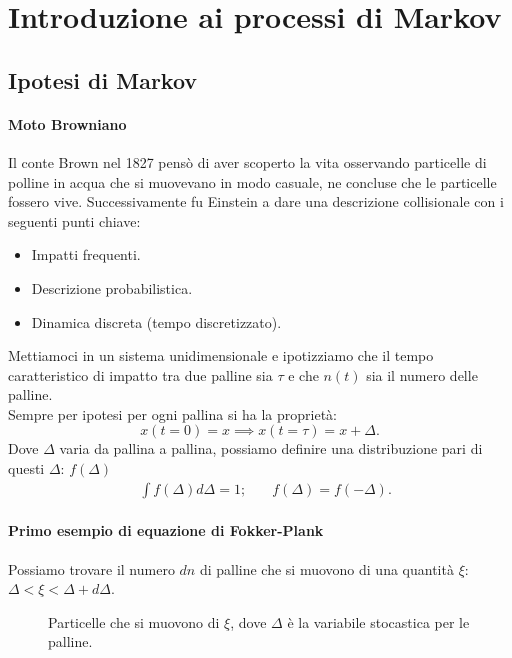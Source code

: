 \section{Introduzione ai processi di Markov}%
\label{sub:Lezione 1}
\mylocaltoc
\subsection{Ipotesi di Markov}%
\paragraph{Moto Browniano}
Il conte Brown nel 1827 pensò di aver scoperto la vita osservando particelle di polline in acqua che si muovevano in modo casuale, ne concluse che le particelle fossero vive. Successivamente fu Einstein a dare una descrizione collisionale con i seguenti punti chiave:
\begin{itemize}
    \item Impatti frequenti.
    \item Descrizione probabilistica.
    \item Dinamica discreta (tempo discretizzato).
\end{itemize}
Mettiamoci in un sistema unidimensionale e ipotizziamo che il tempo caratteristico di impatto tra due palline sia $\tau$ e che $n(t)$ sia il numero delle palline.\\
Sempre per ipotesi per ogni pallina si ha la proprietà:
\[
    x(t=0) = x \implies  x(t=\tau) = x + \Delta
.\] 
Dove $\Delta$ varia da pallina a pallina, possiamo definire una distribuzione pari di questi $\Delta$: $f(\Delta)$
\[\begin{aligned}
    &\int f(\Delta) d\Delta = 1; \quad &f(\Delta) = f(-\Delta) 
.\end{aligned}\]
\paragraph{Primo esempio di equazione di Fokker-Plank}%
Possiamo trovare il numero $dn$ di palline che si muovono di una quantità $\xi$: $\Delta < \xi < \Delta  + d\Delta$.
\begin{figure}[H]
    \centering
    \caption{\scriptsize Particelle che si muovono di $\xi$, dove $\Delta$ è la variabile stocastica per le palline.}
    \label{fig:1-brown}
\end{figure}
\noindent

